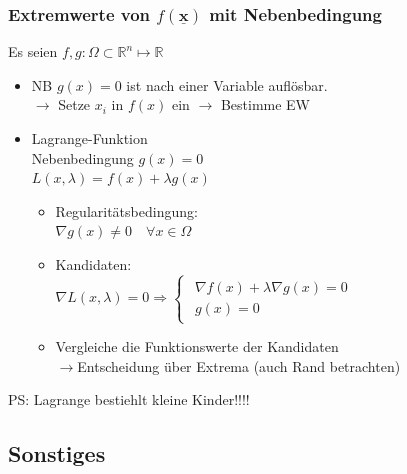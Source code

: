 \documentclass[6pt,a4paper]{scrartcl}
\renewcommand{\vec}[1]{\ensuremath{\underline{\boldsymbol {#1}}}}								%
\newcommand{\Ra}[0]{\ensuremath{\Rightarrow}}									%
\newcommand{\ra}[0]{\ensuremath{\rightarrow}} 									%
\newcommand{\R}{\ensuremath{\mathbb R}}
\begin{document}
\begin{multicols}{4}
\subsubsection{Extremwerte von $f(\vec x)$ mit Nebenbedingung}
Es seien $f,g:\Omega \subset \R^n \mapsto \R$
\begin{itemize} \itemsep0pt
	\item NB $g(x) = 0$ ist nach einer Variable auflösbar. \\
	$\ra$ Setze $x_i$ in $f(x)$ ein $\ra$ Bestimme EW
	\item Lagrange-Funktion \\
	Nebenbedingung $g(x) = 0$\\
	$\boxed{L(x, \lambda) = f(x) + \lambda g(x)}$
	\begin{itemize} \itemsep0pt
		\item Regularitätsbedingung: \\
			$\nabla{g(x)} \neq 0 \quad \forall x \in \Omega$
		\item Kandidaten: \\
			$\nabla{L(x, \lambda)} = 0 \Ra \begin{cases}
				\begin{array}{r}
					\nabla{f(x)} + \lambda\nabla{g(x)} = 0 \\
					g(x) = 0
				\end{array}
			\end{cases}$
		\item Vergleiche die Funktionswerte der Kandidaten \\
			\ra Entscheidung über Extrema (auch Rand betrachten)
	\end{itemize}
\end{itemize}
	PS: Lagrange bestiehlt kleine Kinder!!!!





\subsection{Sonstiges}




\end{multicols}
\end{document}
